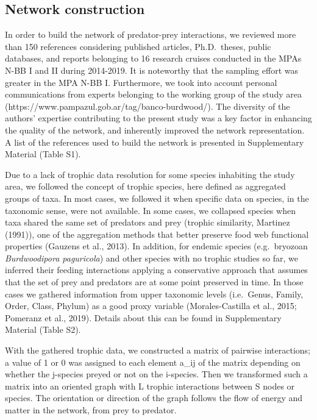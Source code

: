 \documentclass[preprint, 3p,
authoryear]{elsarticle} %
\begin{document}
\hypertarget{network-construction}{%
\subsection{Network construction}\label{network-construction}}

In order to build the network of predator-prey interactions, we reviewed
more than 150 references considering published articles, Ph.D.~theses,
public databases, and reports belonging to 16 research cruises conducted
in the MPAs N-BB I and II during 2014-2019. It is noteworthy that the
sampling effort was greater in the MPA N-BB I. Furthermore, we took into
account personal communications from experts belonging to the working
group of the study area
(https://www.pampazul.gob.ar/tag/banco-burdwood/). The diversity of the
authors' expertise contributing to the present study was a key factor in
enhancing the quality of the network, and inherently improved the
network representation. A list of the references used to build the
network is presented in Supplementary Material (Table S1).

Due to a lack of trophic data resolution for some species inhabiting the
study area, we followed the concept of trophic species, here defined as
aggregated groups of taxa. In most cases, we followed it when specific
data on species, in the taxonomic sense, were not available. In some
cases, we collapsed species when taxa shared the same set of predators
and prey (trophic similarity, Martinez (1991)), one of the aggregation
methods that better preserve food web functional properties (Gauzens et
al., 2013). In addition, for endemic species (e.g.~bryozoan
\emph{Burdwoodipora paguricola}) and other species with no trophic
studies so far, we inferred their feeding interactions applying a
conservative approach that assumes that the set of prey and predators
are at some point preserved in time. In those cases we gathered
information from upper taxonomic levels (i.e.~Genus, Family, Order,
Class, Phylum) as a good proxy variable (Morales-Castilla et al., 2015;
Pomeranz et al., 2019). Details about this can be found in Supplementary
Material (Table S2).

With the gathered trophic data, we constructed a matrix of pairwise
interactions; a value of 1 or 0 was assigned to each element a\_ij of
the matrix depending on whether the j-species preyed or not on the
i-species. Then we transformed such a matrix into an oriented graph with
L trophic interactions between S nodes or species. The orientation or
direction of the graph follows the flow of energy and matter in the
network, from prey to predator.
\end{document}
